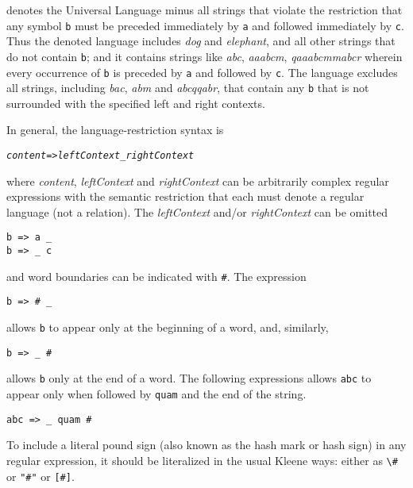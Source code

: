 \noindent
denotes the Universal Language minus all strings that violate
the restriction that any symbol \texttt{b} must
be preceded immediately by \texttt{a} and followed immediately by
\texttt{c}.  Thus the denoted language includes \emph{dog} and
\emph{elephant}, and all other strings that do not contain
\texttt{b}; and it contains strings like \emph{abc}, \emph{aaabcm},
\emph{qaaabcmmabcr} wherein every occurrence of \texttt{b} is
preceded by \texttt{a} and followed by \texttt{c}.  The language
excludes all strings, including \emph{bac}, \emph{abm} and
\emph{abcqqabr}, that contain any \texttt{b} that is not surrounded
with the specified left and right contexts.

In general, the language-restriction syntax is

\begin{alltt}
\emph{content} => \emph{leftContext} _ \emph{rightContext}
\end{alltt}

\noindent
where \emph{content}, \emph{leftContext} and \emph{rightContext}
can be arbitrarily complex regular expressions with the semantic
restriction that each must denote a regular language (not a
relation).  The \emph{leftContext} and/or \emph{rightContext} can
be omitted

\begin{Verbatim}
b => a _
b => _ c
\end{Verbatim}

\noindent
and word boundaries can be indicated with \texttt{\#}.  The
expression

\begin{Verbatim}
b => # _
\end{Verbatim}

\noindent
allows \texttt{b} to appear only at the beginning of a word, and,
similarly,

\begin{Verbatim}
b => _ #
\end{Verbatim}

\noindent
allows \texttt{b} only at the end of a word.  The following
expressions allows \texttt{abc} to appear only when followed by
\texttt{quam} and the end of the string.

\begin{Verbatim}
abc => _ quam #
\end{Verbatim}

\noindent
To include a literal pound sign (also known as the hash mark or
hash sign) in any regular expression, it should be literalized in
the usual Kleene ways:  either as \verb!\#! or \verb!"#"! or \verb![#]!. 

